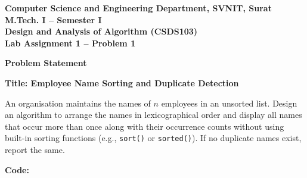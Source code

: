 \documentclass[12pt]{article}
\begin{document}

\begin{center}
\textbf{Computer Science and Engineering Department, SVNIT, Surat}\\
\textbf{M.Tech. I -- Semester I}\\
\textbf{Design and Analysis of Algorithm (CSDS103)}\\
\textbf{Lab Assignment 1 -- Problem 1}
\end{center}

\vspace{0.4cm}

\textbf{Problem Statement}

\textbf{Title: Employee Name Sorting and Duplicate Detection}

An organisation maintains the names of $n$ employees in an unsorted list. Design an algorithm to arrange the names in lexicographical order and display all names that occur more than once along with their occurrence counts without using built-in sorting functions (e.g., \texttt{sort()} or \texttt{sorted()}). If no duplicate names exist, report the same.

\vspace{0.3cm}

\textbf{Code:}
\end{document}
